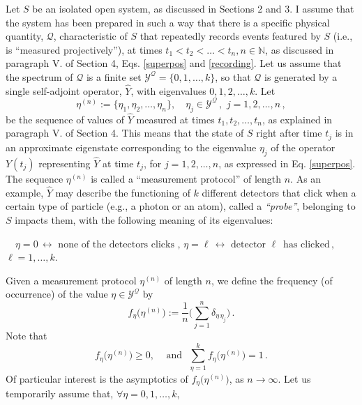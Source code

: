 \documentclass[12pt]{article}
\begin{document}
Let $S$ be an isolated open system, as discussed in Sections 2 and 3. I assume that the system has been prepared in such a way that there is a specific physical quantity, $\mathcal{Q}$, characteristic of $S$ that repeatedly records events featured by $S$ (i.e., is ``measured projectively''), at times $t_1<t_2<\dots < t_n, n\in \mathbb{N}$, as discussed in paragraph V. of Section 4, Eqs. \eqref{superpos} and \eqref{recording}. Let us assume that the spectrum of $\mathcal{Q}$ is a finite set $\mathcal{Y}^{\mathcal{Q}} = \lbrace 0,1, \dots, k \rbrace$, so that 
$\mathcal{Q}$ is generated by a single self-adjoint operator, $\widehat{Y}$, with eigenvalues $0, 1,2,\dots,k$. Let
\begin{equation}\label{meas-prot}
{\eta}^{(n)}:= \lbrace \eta_1, \eta_2, \dots, \eta_n \rbrace, \quad \eta_{j} \in \mathcal{Y}^{\mathcal{Q}}\,, \,\, j=1,2,\dots, n\,,
\end{equation}
be the sequence of values of $\widehat{Y}$ measured at times $t_1, t_2, \dots, t_n$, as explained in paragraph V. of Section 4. This means that the state of $S$ right after time $t_j$ is in an approximate eigenstate corresponding to the eigenvalue $\eta_j$ of the operator $Y(t_j)$ representing 
$\widehat{Y}$ at time $t_j$, for $j=1,2,\dots,n$, as expressed in Eq. \eqref{superpos}. The sequence ${\eta}^{(n)}$ is called a ``measurement protocol'' of length $n$. As an example, $\widehat{Y}$ may describe the functioning of $k$ different detectors that click when a certain type of particle (e.g., a photon or an atom), called a \textit{``probe''}, belonging to $S$ impacts them, with the following meaning of its eigenvalues:
\begin{center}
$\quad \eta =0\, \leftrightarrow \text{   none of the detectors clicks  },\, \eta = \ell \, \leftrightarrow \text{   detector  } \ell \,\text{  has clicked}\,,$\\
$\ell = 1,\dots, k$.
\end{center}
Given a measurement protocol ${\eta}^{(n)}$ of length $n$, we define the frequency (of occurrence) of the value 
$\eta \in \mathcal{Y}^{\mathcal{Q}}$ by
\begin{equation}\label{frequency}
f_{\eta}\big({\eta}^{(n)}\big):= \frac{1}{n} \Big(\sum_{j=1}^{n} \delta_{\eta\, \eta_j} \Big)\,.
\end{equation}
Note that
$$f_{\eta}\big({\eta}^{(n)}\big) \geq 0, \quad \,\text{and   }\,\, \sum_{\eta=1}^{k} f_{\eta}\big({\eta}^{(n)}\big) = 1\,.$$
Of particular interest is the asymptotics of $f_{\eta}\big({\eta}^{(n)}\big)$, as $n\rightarrow \infty$. Let us temporarily assume that, $\forall \eta = 0, 1,\dots, k$,
\end{document}
